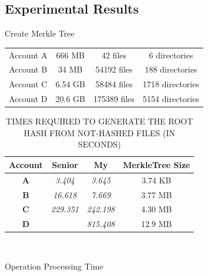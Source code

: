 \documentclass{beamer}
\begin{document}
\begin{CJK}{UTF8}{bkai}
\section{Experimental Results}
\begin{frame}{Create Merkle Tree}
	\begin{center}
	\begin{tabu}{cccc}
	\rowfont{\color{blue} \scriptsize} {Account A} & {666 MB}  & {42 files}     & {6 directories}    \\
	\rowfont{\color{blue} \scriptsize} {Account B} & {34 MB}   & {54192 files}  & {188 directories}  \\
	\rowfont{\color{blue} \scriptsize} {Account C} & {6.54 GB} & {58484 files}  & {1718 directories} \\
	\rowfont{\color{blue} \scriptsize} {Account D} & {20.6 GB} & {175389 files} & {5154 directories} \\
	\end{tabu}
	\end{center}
	\begin{table}[]
	\centering
	\captionsetup{justification=centering}
	\caption{\tiny TIMES REQUIRED TO GENERATE THE ROOT HASH FROM NOT-HASHED FILES (IN SECONDS)}
	\begin{tabular}{|c|c|c|c|}
	\hline
	{\bf Account} & {\bf Senior}  & {\bf My}      & {\bf MerkleTree Size} \\ \hline
	{\bf A}       & {\it 3.404}   & {\it 3.645}   & {3.74 KB}             \\ \hline
	{\bf B}       & {\it 16.618}  & {\it 7.669}   & {3.77 MB}             \\ \hline
	{\bf C}       & {\it 229.351} & {\it 242.198} & {4.30 MB}             \\ \hline
	{\bf D}       & {\it }        & {\it 815.408} & {12.9 MB}             \\ \hline
	\end{tabular}\\
	\end{table}
\end{frame}
\begin{frame}{Operation Processing Time}
	\begin{table}[]
\end{table}
\end{frame}
\end{CJK}
\end{document}
